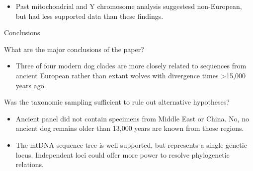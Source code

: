 \documentclass[12pt,a4paper]{article}
\begin{document}
\begin{itemize}
\begin{itemize}
\begin{itemize}
                    \item Past mitochondrial and Y chromosome analysis suggestesd non-European, but had less supported data than these findings.
                \end{itemize}
        \end{itemize}
    \item Conclusions
        \begin{itemize}
            {\color{darklc} \item  What are the major conclusions of the paper?}
                \begin{itemize}
                    \item Three of four modern dog clades are more closely related to sequences from ancient European rather than extant wolves with divergence times >15,000 years ago.
                \end{itemize}
            {\color{darklc} \item  Was the taxonomic sampling sufficient to rule out alternative hypotheses? }
                \begin{itemize}
                    \item Ancient panel did not contain specimens from Middle East or China. No, no ancient dog remains older than 13,000 years are known from those regions.
                    \item The mtDNA sequence tree is well supported, but represents a single genetic locus. Independent loci could offer more power to resolve phylogenetic relations.
                \end{itemize}
        \end{itemize}
\end{itemize}

\clearpage
{}
\end{document}
